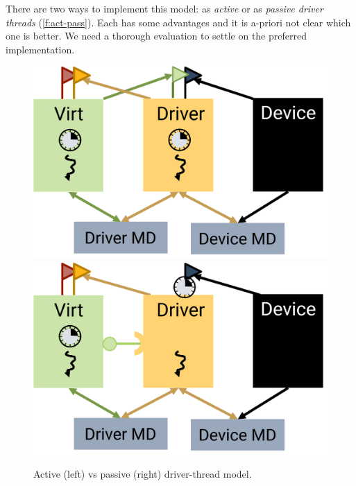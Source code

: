 \documentclass[a4paper,12pt]{report}
\newcommand{\figscale}{0.2}
\begin{document}

There are two ways to implement this model: as \emph{active} or as
\emph{passive driver threads} (\autoref{f:act-pass}).  Each has some advantages and it is a-priori
not clear which one is better. We need a thorough evaluation to settle
on the preferred implementation.

\begin{figure}[th]
  \hspace*{\fill}
  \includegraphics[scale=\figscale]{active}
  \hspace{\fill}
  \hspace{\fill}
  \includegraphics[scale=\figscale]{passive}
  \hspace*{\fill}
  \caption{Active (left) vs passive (right) driver-thread model.}
  \label{f:act-pass}
\end{figure}
\end{document}
